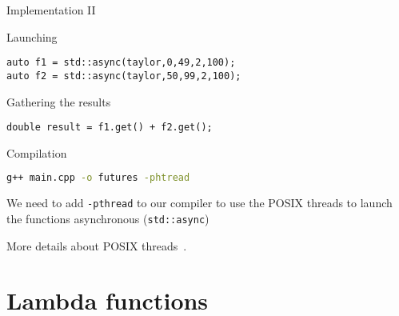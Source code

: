 \documentclass[12pt,t]{beamer}
\begin{document}
\begin{frame}[fragile]{Implementation II}

\begin{block}{Launching}
\begin{lstlisting}
auto f1 = std::async(taylor,0,49,2,100); 
auto f2 = std::async(taylor,50,99,2,100); 
\end{lstlisting}
\end{block}

\begin{block}{Gathering the results}
\begin{lstlisting}
double result = f1.get() + f2.get();
\end{lstlisting}
\end{block}

\begin{block}{Compilation}
\begin{lstlisting}[language=bash]
g++ main.cpp -o futures -phtread
\end{lstlisting}
We need to add \lstinline|-pthread| to our compiler to use the POSIX threads to launch the functions asynchronous  (\lstinline|std::async|)
\end{block}
More details about POSIX threads~\cite{butenhof1997programming,kleiman1996programming}.
\end{frame}



\section{Lambda functions}
\end{document}
